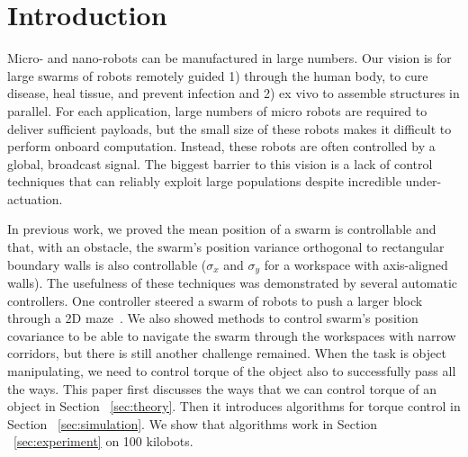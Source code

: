 \section{Introduction}\label{sec:Intro}
Micro- and nano-robots can be manufactured in large numbers.
Our vision is for large swarms of robots remotely guided 1) through the human body, to cure disease, heal tissue, and prevent infection and 2) ex vivo to assemble structures in parallel. 
 For each application, large numbers of micro robots are required  to deliver sufficient payloads, but the small size of these robots makes it difficult to perform onboard computation.  Instead, these robots are often controlled by a global, broadcast signal. 
 The biggest barrier to this vision is a lack of control techniques that can reliably exploit large populations despite incredible under-actuation.  
 



In previous work, we proved the mean position of a swarm is controllable and that, with an obstacle, the swarm's position variance orthogonal to rectangular boundary walls  is also controllable
($\sigma_x$ and $\sigma_y$ for a workspace with axis-aligned walls). 
The usefulness of these techniques was demonstrated by several automatic controllers. One controller steered a swarm of robots to push a larger block through a 2D maze~\cite{ShahrokhiIROS2015}. 
We also showed methods to control swarm's position covariance to be able to navigate the swarm through the workspaces with narrow corridors, but there is still another challenge remained. When the task is object manipulating, we need to control torque of the object also to successfully pass all the ways. 
This paper first discusses the ways that we can control torque of an object in Section ~\ref{sec:theory}. Then it introduces algorithms for torque control in Section ~\ref{sec:simulation}. We show that algorithms work in Section ~\ref{sec:experiment} on 100 kilobots.



